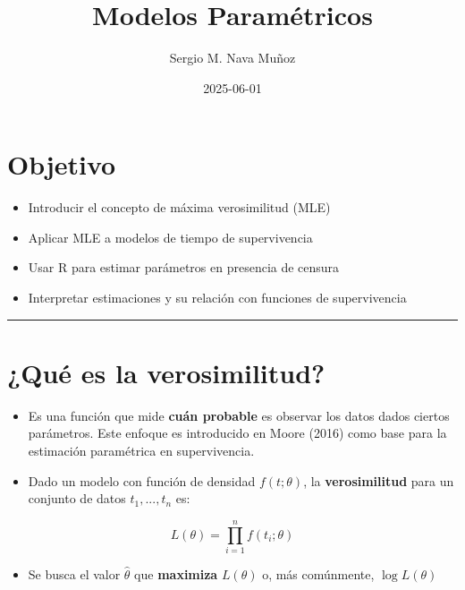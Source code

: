 \documentclass[
]{article}
\title{Modelos Paramétricos}
\author{Sergio M. Nava Muñoz}
\date{2025-06-01}
\providecommand{\tightlist}{%
  \setlength{\itemsep}{0pt}\setlength{\parskip}{0pt}}
\renewcommand*\contentsname{Table of contents}
\newcommand\contentsname{Table of contents}
\begin{document}
\maketitle

\renewcommand*\contentsname{Table of contents}
{
\hypersetup{linkcolor=}
\setcounter{tocdepth}{2}
\tableofcontents
}

\section{Objetivo}\label{objetivo}

\begin{itemize}
\tightlist
\item
  Introducir el concepto de máxima verosimilitud (MLE)
\item
  Aplicar MLE a modelos de tiempo de supervivencia
\item
  Usar R para estimar parámetros en presencia de censura
\item
  Interpretar estimaciones y su relación con funciones de supervivencia
\end{itemize}

\begin{center}\rule{0.5\linewidth}{0.5pt}\end{center}

\section{¿Qué es la verosimilitud?}\label{quuxe9-es-la-verosimilitud}

\begin{itemize}
\item
  Es una función que mide \textbf{cuán probable} es observar los datos
  dados ciertos parámetros. Este enfoque es introducido en Moore (2016)
  como base para la estimación paramétrica en supervivencia.
\item
  Dado un modelo con función de densidad \(f(t; \theta)\), la
  \textbf{verosimilitud} para un conjunto de datos \(t_1, ..., t_n\) es:
\end{itemize}

\[
L(\theta) = \prod_{i=1}^n f(t_i; \theta)
\]

\begin{itemize}
\tightlist
\item
  Se busca el valor \(\hat{\theta}\) que \textbf{maximiza} \(L(\theta)\)
  o, más comúnmente, \(\log L(\theta)\)
\end{itemize}
\end{document}
